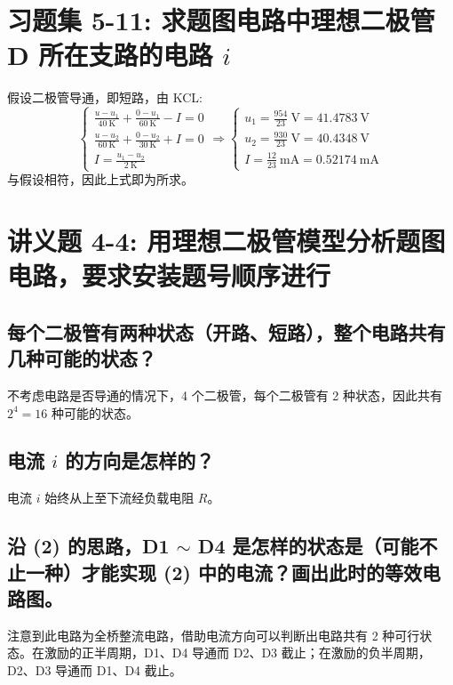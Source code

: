 \documentclass[UTF8]{report}
\def\K{\ \mathrm{K}}
\def\mA{\ \mathrm{mA}}
\theoremstyle{MyLineTheoremStyle} %
\theoremstyle{MyBlockTheoremStyle} %
\theoremstyle{MySubsubsectionStyle} %
\begin{document}
\section{习题集 5-11: 求题图电路中理想二极管 D 所在支路的电路 $i$}
假设二极管导通，即短路，由 KCL:
\begin{equation}
\begin{cases}
    \frac{u - u_1}{40 \K} + \frac{0 - u_1}{60 \K} - I = 0 \\ 
    \frac{u - u_2}{60 \K} + \frac{0 - u_2}{30 \K} + I = 0 \\ 
    I = \frac{u_1 - u_2}{2 \K}
\end{cases}\Longrightarrow 
\begin{cases}
    u_1 = \frac{954}{23} \ \mathrm{V} = 41.4783 \ \mathrm{V}\\ 
    u_2 = \frac{930}{23} \ \mathrm{V} = 40.4348 \ \mathrm{V}\\ 
    I = \frac{12}{23} \mA =  0.52174 \mA
\end{cases}
\end{equation}
与假设相符，因此上式即为所求。


\section{讲义题 4-4: 用理想二极管模型分析题图电路，要求安装题号顺序进行}
\subsection{每个二极管有两种状态（开路、短路），整个电路共有几种可能的状态？}
不考虑电路是否导通的情况下，4 个二极管，每个二极管有 2 种状态，因此共有 $2^4 = 16$ 种可能的状态。

\subsection{电流 $i$ 的方向是怎样的？}
电流 $i$ 始终从上至下流经负载电阻 $R$。

\subsection{沿 (2) 的思路，D1 $\sim$ D4 是怎样的状态是（可能不止一种）才能实现 (2) 中的电流？画出此时的等效电路图。}
注意到此电路为全桥整流电路，借助电流方向可以判断出电路共有 2 种可行状态。在激励的正半周期，D1、D4 导通而 D2、D3 截止；在激励的负半周期，D2、D3 导通而 D1、D4 截止。
\end{document}
